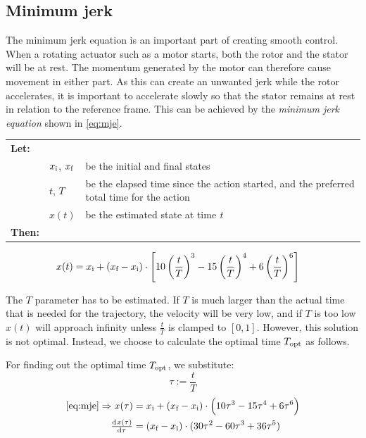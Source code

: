 \documentclass[11pt]{article}
\begin{document}
\subsection{Minimum jerk}
\label{sec:mje}
The minimum jerk equation is an important part of creating smooth control. When a rotating actuator such as a motor starts, both the rotor and the stator will be at rest. The momentum generated by the motor can therefore cause movement in either part. As this can create an unwanted jerk while the rotor accelerates, it is important to accelerate slowly so that the stator remains at rest in relation to the reference frame. This can be achieved by the \emph{minimum jerk equation} shown in \vref{eq:mje}.
\par \vspace{10pt}
{\footnotesize
  \begin{tabular}{l l l}
    \textbf{Let:} \\
 &$x_\textup{i}$, $x_\textup{f}$ &be the initial and final states\\
 &$t$, $T$ &be the elapsed time since the action started, and the preferred total time for the action  \\
 &$x(t)$ &be the estimated state at time \emph{t} \\
    \textbf{Then:}
  \end{tabular}
  \begin{align}
    x(t) &= x_\textup{i} +  (x_\textup{f} - x_\textup{i}) \cdot \left[10\left(\frac{t}{T}\right)^3 - 15\left(\frac{t}{T}\right)^4 + 6\left(\frac{t}{T}\right)^6 \right]\label{eq:mje}          
  \end{align}}
The $T$ parameter has to be estimated. If $T$ is much larger than  the actual time that is needed for the trajectory, the velocity will be very low, and if $T$ is too low $x(t)$ will approach infinity unless $\frac{t}{T}$ is clamped to $[0,1]$. However, this solution is not optimal. Instead, we choose to calculate the optimal time $T_\textup{opt}$ as follows.%
\par
For finding out the optimal time $T_\textup{opt}$, we substitute:
\begin{equation}
  \label{eq:tau_substitution}
  \tau:=\frac{t}{T}
\end{equation}
\vspace{-6mm}
\begin{align}
\ref{eq:mje}\Rightarrow x(\tau)&= \di{x}{i} +  (\di{x}{f} - \di{x}{i}) \cdot \left(10\tau^3 - 15\tau^4 + 6\tau^6 \right)\\
\od{x(\tau)}{\tau}&= (\di{x}{f} - \di{x}{i})\cdot(30\tau^2-60\tau^3+36\tau^5)\label{eq:dx_dtau}
\end{align}
\end{document}
